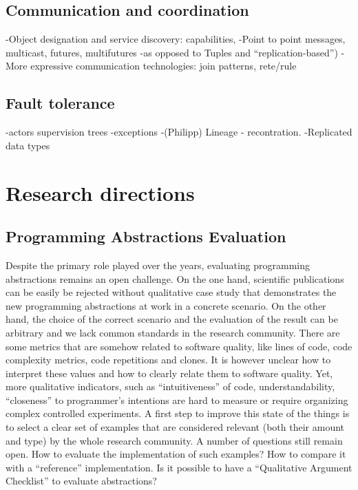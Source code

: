 \documentclass[
graybox,
envcountchap,
]{svmult}
\begin{document}
\begin{bibunit}
\subsection{Communication and coordination}
\label{sub:sec:comm}

-Object designation and service discovery: capabilities, 
-Point to point messages, multicast, futures, multifutures
-as opposed to Tuples and “replication-based”)
-More expressive communication technologies: join patterns, rete/rule


\subsection{Fault tolerance} %
\label{sub:sec:fault}
-actors supervision trees
-exceptions
-(Philipp) Lineage - recontration.
-Replicated data types


\section{Research directions}
\label{sec:dir}

\subsection{Programming Abstractions Evaluation}
\label{sub:sec:eval}

Despite the primary role played over the years,
evaluating programming abstractions remains an 
open challenge. On the one hand, scientific publications
can be easily be rejected without qualitative case study
that demonstrates the new programming abstractions at
work in a concrete scenario.
On the other hand, the choice of the correct scenario 
and the evaluation of the result can be arbitrary and 
we lack common standards in the research community.
There are some metrics that are somehow related 
to software quality, like lines of code, code complexity
metrics, code repetitions and clones. It is however
unclear how to interpret these values and how to clearly 
relate them to software quality.
Yet, more qualitative indicators, such as 
``intuitiveness'' of code, understandability, 
``closeness'' to programmer's intentions are
hard to measure or require organizing complex controlled
experiments. 
%
A first step to improve this state of the things is to 
select a clear set of examples that are considered relevant 
(both their amount and type) by the whole research community.
A number of questions still remain open.
How to evaluate the implementation of such examples? 
How to compare it with a ``reference'' implementation.
Is it possible to have a “Qualitative Argument Checklist” 
to evaluate abstractions?


\end{bibunit}
\end{document}
